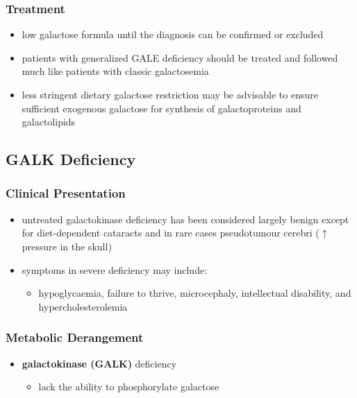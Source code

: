 \documentclass[12pt]{scrartcl}
\begin{document}
\subsubsection{Treatment}
\label{sec:org7b15b37}
\begin{itemize}
\item low galactose formula until the diagnosis can be confirmed or excluded
\item patients with generalized GALE deficiency should be treated and
followed much like patients with classic galactosemia
\item less stringent dietary galactose restriction may be advisable to
ensure sufficient exogenous galactose for synthesis of
galactoproteins and galactolipids
\end{itemize}
\subsection{GALK Deficiency}
\label{sec:orga6f81d2}
\subsubsection{Clinical Presentation}
\label{sec:org296acd2}
\begin{itemize}
\item untreated galactokinase deficiency has been considered largely
benign except for diet-dependent cataracts and in rare cases
pseudotumour cerebri (\(\uparrow\) pressure in the skull)
\item symptoms in severe deficiency may include:
\begin{itemize}
\item hypoglycaemia, failure to thrive, microcephaly, intellectual
disability, and hypercholesterolemia
\end{itemize}
\end{itemize}

\subsubsection{Metabolic Derangement}
\label{sec:orgf44e724}
\begin{itemize}
\item \textbf{galactokinase (GALK)} deficiency
\begin{itemize}
\item lack the ability to phosphorylate galactose
\end{itemize}
\end{itemize}
\end{document}

